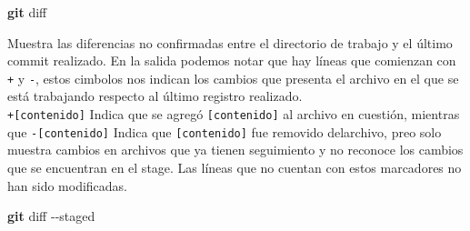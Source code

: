 \documentclass[
]{book}
\newenvironment{Shaded}{\begin{snugshade}}{\end{snugshade}}
\newcommand{\AttributeTok}[1]{\textcolor[rgb]{0.13,0.29,0.53}{#1}}
\newcommand{\DataTypeTok}[1]{\textcolor[rgb]{0.13,0.29,0.53}{#1}}
\newcommand{\ExtensionTok}[1]{#1}
\newcommand{\FunctionTok}[1]{\textcolor[rgb]{0.13,0.29,0.53}{\textbf{#1}}}
\newcommand{\NormalTok}[1]{#1}
\newcommand{\VariableTok}[1]{\textcolor[rgb]{0.00,0.00,0.00}{#1}}
\begin{document}
\begin{Shaded}
\begin{Highlighting}[]
\FunctionTok{git}\NormalTok{ diff}
\end{Highlighting}
\end{Shaded}

\begin{Shaded}
\end{Shaded}

Muestra las diferencias no confirmadas entre el directorio de trabajo y el último commit realizado. En la salida podemos notar que hay líneas que comienzan con \texttt{+} y \texttt{-}, estos cimbolos nos indican los cambios que presenta el archivo en el que se está trabajando respecto al último registro realizado.\\
\texttt{+{[}contenido{]}} Indica que se agregó \texttt{{[}contenido{]}} al archivo en cuestión, mientras que
\texttt{-{[}contenido{]}} Indica que \texttt{{[}contenido{]}} fue removido delarchivo, preo solo muestra cambios en archivos que ya tienen seguimiento y no reconoce los cambios que se encuentran en el stage. Las líneas que no cuentan con estos marcadores no han sido modificadas.

\begin{Shaded}
\begin{Highlighting}[]
\FunctionTok{git}\NormalTok{ diff }\AttributeTok{{-}{-}staged}
\end{Highlighting}
\end{Shaded}
\end{document}
